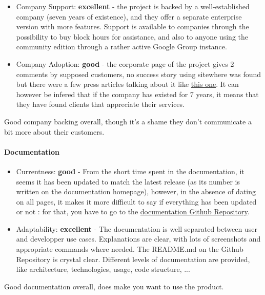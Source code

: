 \documentclass{article}
\begin{document}
\begin{itemize}
\item Company Support: \textbf{excellent} - the project is backed by a well-established company (seven years of existence), and they offer a separate enterprise version with more features. Support is available to companies through the possibility to buy block hours for assistance, and also to anyone using the community edition through a rather active Google Group instance.
\item Company Adoption: \textbf{good} - the corporate page of the project gives 2 comments by supposed customers, no success story using sitewhere was found but there were a few press articles talking about it like \href{https://opensourceforu.com/2017/07/sitewhere-open-platform-connected-devices/?utm_content=buffer4c828&utm_medium=social&utm_source=twitter.com&utm_campaign=buffer}{this one}. It can however be infered that if the company has existed for 7 years, it means that they have found clients that appreciate their services.
\end{itemize}

Good company backing overall, though it's a shame they don't communicate a bit more about their customers.

\paragraph{Documentation}

\begin{itemize}
\item Currentness: \textbf{good} - From the short time spent in the documentation, it seems it has been updated to match the latest release (as its number is written on the documentation homepage), however, in the absence of dating on all pages, it makes it more difficult to say if everything has been updated or not : for that, you have to go to the \href{https://github.com/sitewhere/sitewhere-documentation/}{documentation Github Repository}.
\item Adaptability: \textbf{excellent} - The documentation is well separated between user and developper use cases. Explanations are clear, with lots of screenshots and appropriate commands where needed. The README.md on the Github Repository is crystal clear. Different levels of documentation are provided, like architecture, technologies, usage, code structure, ...
\end{itemize}

Good documentation overall, does make you want to use the product.
\end{document}
